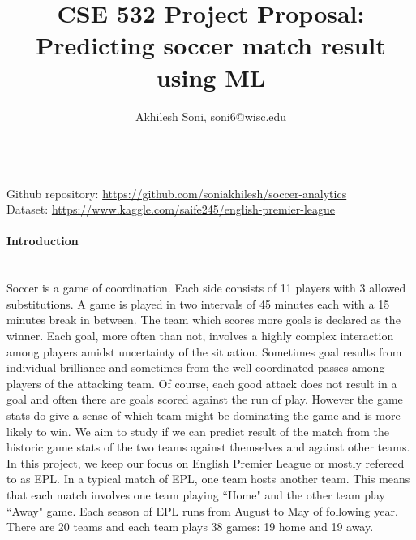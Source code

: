\documentclass[11pt,letterpaper]{article}
\begin{document}
\title{CSE 532 Project Proposal: Predicting soccer match result using ML}
\date{}
\author{Akhilesh Soni, soni6@wisc.edu}
\maketitle
\paragraph{}\text{}\\
Github repository: \href{https://github.com/soniakhilesh/soccer-analytics}{https://github.com/soniakhilesh/soccer-analytics} \\
Dataset: \href{https://www.kaggle.com/saife245/english-premier-league}{https://www.kaggle.com/saife245/english-premier-league}
\paragraph{Introduction}\text{}\\
Soccer is a game of coordination. Each side consists of 11 players with 3 allowed substitutions. A game is played in two intervals of 45 minutes each with a 15 minutes break in between. The team which scores more goals is declared as the winner. Each goal, more often than not, involves a highly complex interaction among players amidst uncertainty of the situation. Sometimes goal results from individual brilliance and sometimes from the well coordinated passes among players of the attacking team. Of course, each good attack does not result in a goal and often there are goals scored against the run of play. However the game stats do give a sense of which team might be dominating the game and is more likely to win. We aim to study if we can predict result of the match from the historic game stats of the two teams against themselves and against other teams.
In this project, we keep our focus on English Premier League or mostly refereed to as EPL. In a typical match of EPL, one team hosts another team. This means that each match involves one team playing ``Home" and the other team play ``Away" game. Each season of EPL runs from August to  May of following year. There are 20 teams and each team plays 38 games: 19 home and 19 away. 
\end{document}
